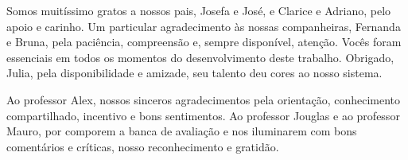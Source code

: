 \begin{agradece}	%

Somos muitíssimo gratos a nossos pais, Josefa e José, e Clarice e Adriano, pelo apoio e carinho. Um particular agradecimento às nossas companheiras, Fernanda e Bruna, pela paciência, compreensão e, sempre disponível, atenção. Vocês foram essenciais em todos os momentos do desenvolvimento deste trabalho. Obrigado, Julia, pela disponibilidade e amizade, seu talento deu cores ao nosso sistema.

Ao professor Alex, nossos sinceros agradecimentos pela orientação, conhecimento compartilhado, incentivo e bons sentimentos. Ao professor Jouglas e ao professor Mauro, por comporem a banca de avaliação e nos iluminarem com bons comentários e críticas, nosso reconhecimento e gratidão.



\end{agradece}

